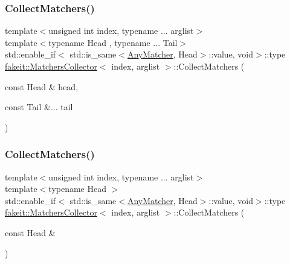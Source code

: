 \mbox{\label{classfakeit_1_1MatchersCollector_a5bc97a3d729b1bb67e372181ad88b77d}} 
\subsubsection{\texorpdfstring{CollectMatchers()}{CollectMatchers()}\hspace{0.1cm}{\footnotesize\ttfamily [33/63]}}
{\footnotesize\ttfamily template$<$unsigned int index, typename ... arglist$>$ \\
template$<$typename Head , typename ... Tail$>$ \\
std\+::enable\+\_\+if$<$ std\+::is\+\_\+same$<$\mbox{\hyperlink{structfakeit_1_1AnyMatcher}{Any\+Matcher}}, Head$>$\+::value, void$>$\+::type \mbox{\hyperlink{classfakeit_1_1MatchersCollector}{fakeit\+::\+Matchers\+Collector}}$<$ index, arglist $>$\+::Collect\+Matchers (\begin{DoxyParamCaption}\item[{const Head \&}]{head,  }\item[{const Tail \&...}]{tail }\end{DoxyParamCaption})\hspace{0.3cm}{\ttfamily [inline]}}

\mbox{\label{classfakeit_1_1MatchersCollector_a89350af9ba2e7aaead8bd7b007f03631}} 
\subsubsection{\texorpdfstring{CollectMatchers()}{CollectMatchers()}\hspace{0.1cm}{\footnotesize\ttfamily [34/63]}}
{\footnotesize\ttfamily template$<$unsigned int index, typename ... arglist$>$ \\
template$<$typename Head $>$ \\
std\+::enable\+\_\+if$<$ std\+::is\+\_\+same$<$\mbox{\hyperlink{structfakeit_1_1AnyMatcher}{Any\+Matcher}}, Head$>$\+::value, void$>$\+::type \mbox{\hyperlink{classfakeit_1_1MatchersCollector}{fakeit\+::\+Matchers\+Collector}}$<$ index, arglist $>$\+::Collect\+Matchers (\begin{DoxyParamCaption}\item[{const Head \&}]{ }\end{DoxyParamCaption})\hspace{0.3cm}{\ttfamily [inline]}}

